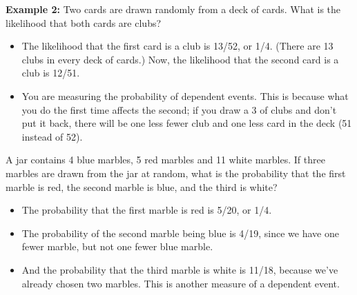 \item \textbf{Example 2:} Two cards are drawn randomly from a deck of cards. What is the likelihood that both cards are clubs?
\begin{itemize}
\item The likelihood that the first card is a club is 13/52, or 1/4. (There are 13 clubs in every deck of cards.) Now, the likelihood that the second card is a club is 12/51.
\item You are measuring the probability of dependent events. This is because what you do the first time affects the second; if you draw a 3 of clubs and don't put it back, there will be one less fewer club and one less card in the deck (51 instead of 52).
\end{itemize}
\item A jar contains 4 blue marbles, 5 red marbles and 11 white marbles. If three marbles are drawn from the jar at random, what is the probability that the first marble is red, the second marble is blue, and the third is white?
\begin{itemize}
\item The probability that the first marble is red is 5/20, or 1/4. 
\item The probability of the second marble being blue is 4/19, since we have one fewer marble, but not one fewer blue marble. 
\item And the probability that the third marble is white is 11/18, because we've already chosen two marbles. This is another measure of a dependent event.
\end{itemize}
